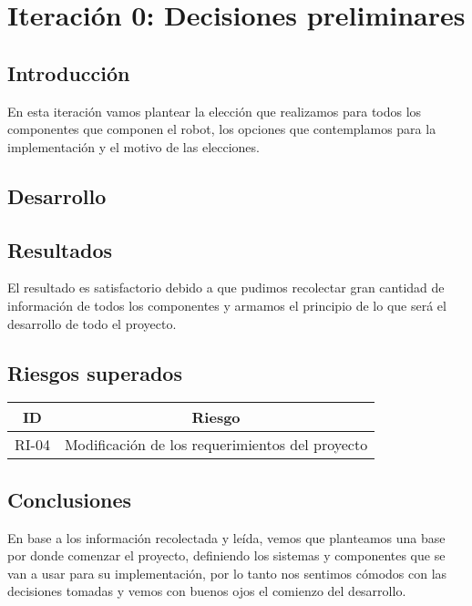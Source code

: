 \newpage
\section{Iteración 0: Decisiones preliminares}
\subsection{Introducción}
En esta iteración vamos plantear la elección que realizamos para todos los componentes que componen el robot, los opciones que contemplamos para la implementación y el motivo de las elecciones.



\subsection{Desarrollo}

















\subsection{Resultados}
El resultado es satisfactorio debido a que pudimos recolectar gran cantidad de información de todos los componentes y armamos el principio de lo que será el desarrollo de todo el proyecto.

\subsection{Riesgos superados}
\begin{center}
    \begin{tabular} {
        | c| c |}
        \hline
            ID & Riesgo \\
        \hline
            RI-04 & Modificación de los requerimientos del proyecto\\
        \hline
    \end{tabular}
\end{center}

\subsection{Conclusiones}
En base a los información recolectada y leída, vemos que planteamos una base por donde comenzar el proyecto, definiendo los sistemas y componentes que se van a usar para su implementación, por lo tanto nos sentimos cómodos con las decisiones tomadas y vemos con buenos ojos el comienzo del desarrollo.